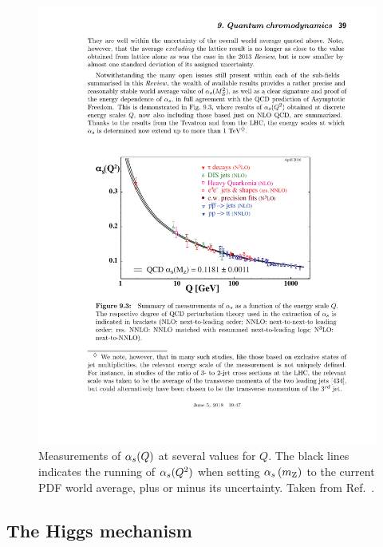 \begin{figure}[hbtp]
  \begin{center}
    \includegraphics[width=0.7\linewidth]{img/theory/alphasscaling.pdf}
    \caption{
        Measurements of $\alpha_s(Q)$ at several values for $Q$.
        The black lines indicates the running of $\alpha_s(Q^2)$ when setting $\alpha_s \left( m_\mathrm{Z} \right) $ to the current PDF world average, plus or minus its uncertainty.
        Taken from Ref.~\cite{pdg}.
        }
    \label{fig:alphasscaling}
  \end{center}
\end{figure}



\subsection{The Higgs mechanism}

